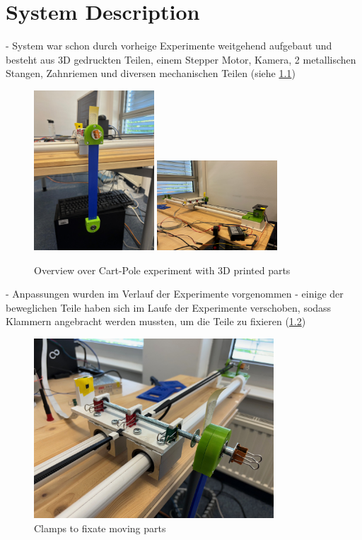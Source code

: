 \chapter{System Description}

- System war schon durch vorheige Experimente weitgehend aufgebaut und besteht aus 3D gedruckten Teilen, einem Stepper Motor, Kamera, 2 metallischen Stangen, Zahnriemen und diversen mechanischen Teilen (siehe \ref{fig:overview_cart_pole_experiment})
\begin{figure}[htbp]
    \centering
    \includegraphics[width=0.4\textwidth]{img/front.jpg}
    \includegraphics[width=0.4\textwidth]{img/back.jpg}
    \caption{Overview over Cart-Pole experiment with 3D printed parts}
    \label{fig:overview_cart_pole_experiment}
\end{figure}
- Anpassungen wurden im Verlauf der Experimente vorgenommen
- einige der beweglichen Teile haben sich im Laufe der Experimente verschoben, sodass Klammern angebracht werden mussten, um die Teile zu fixieren (\ref{fig:clamps})
\begin{figure}[htbp]
    \centering
    \includegraphics[width=0.8\textwidth]{img/clamps.jpg}
    \caption{Clamps to fixate moving parts}
    \label{fig:clamps}
\end{figure}

